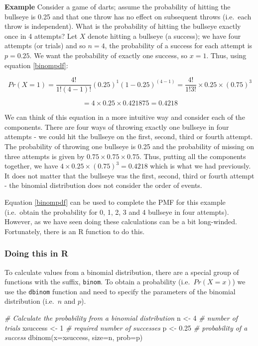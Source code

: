\documentclass[
  oneside]{krantz}
\newenvironment{Shaded}{\begin{snugshade}}{\end{snugshade}}
\newcommand{\AttributeTok}[1]{\textcolor[rgb]{0.77,0.63,0.00}{#1}}
\newcommand{\CommentTok}[1]{\textcolor[rgb]{0.56,0.35,0.01}{\textit{#1}}}
\newcommand{\DecValTok}[1]{\textcolor[rgb]{0.00,0.00,0.81}{#1}}
\newcommand{\FloatTok}[1]{\textcolor[rgb]{0.00,0.00,0.81}{#1}}
\newcommand{\FunctionTok}[1]{\textcolor[rgb]{0.00,0.00,0.00}{#1}}
\newcommand{\NormalTok}[1]{#1}
\newcommand{\OtherTok}[1]{\textcolor[rgb]{0.56,0.35,0.01}{#1}}
\begin{document}
\textbf{Example} Consider a game of darts; assume the probability of hitting the bullseye is 0.25 and that one throw has no effect on subsequent throws (i.e.~each throw is independent). What is the probability of hitting the bullseye exactly once in 4 attempts? Let \(X\) denote hitting a bullseye (a success); we have four attempts (or trials) and so \(n=4\), the probability of a success for each attempt is \(p=0.25\). We want the probability of exactly one success, so \(x=1\). Thus, using equation \ref{binompdf}:

\[Pr(X=1) = \frac{4!}{1!(4-1)!}(0.25)^1 (1-0.25)^{(4-1)} = \frac{4!}{1!3!} \times 0.25 \times (0.75)^3\]

\[ = 4 \times 0.25 \times 0.421875 = 0.4218\]

We can think of this equation in a more intuitive way and consider each of the components. There are four ways of throwing exactly one bullseye in four attempts - we could hit the bullseye on the first, second, third or fourth attempt. The probability of throwing one bullseye is 0.25 and the probability of missing on three attempts is given by \(0.75 \times 0.75 \times 0.75\). Thus, putting all the components together, we have \(4 \times 0.25 \times (0.75)^3 = 0.4218\) which is what we had previously. It does not matter that the bullseye was the first, second, third or fourth attempt - the binomial distribution does not consider the order of events.

Equation \ref{binompdf} can be used to complete the PMF for this example (i.e.~obtain the probability for 0, 1, 2, 3 and 4 bullseye in four attempts). However, as we have seen doing these calculations can be a bit long-winded. Fortunately, there is an R function to do this.

\hypertarget{binomR}{%
\subsubsection{Doing this in R}\label{binomR}}

To calculate values from a binomial distribution, there are a special group of functions with the suffix, \texttt{binom}. To obtain a probability (i.e.~\(Pr(X=x)\)) we use the \texttt{dbinom} function and need to specify the parameters of the binomial distribution (i.e.~\(n\) and \(p\)).

\begin{Shaded}
\begin{Highlighting}[]
\CommentTok{\# Calculate the probability from a binomial distribution}
\NormalTok{n }\OtherTok{\textless{}{-}} \DecValTok{4} \CommentTok{\# number of trials}
\NormalTok{xsuccess }\OtherTok{\textless{}{-}} \DecValTok{1} \CommentTok{\# required number of successes}
\NormalTok{p }\OtherTok{\textless{}{-}} \FloatTok{0.25} \CommentTok{\# probability of a success}
\FunctionTok{dbinom}\NormalTok{(}\AttributeTok{x=}\NormalTok{xsuccess, }\AttributeTok{size=}\NormalTok{n, }\AttributeTok{prob=}\NormalTok{p)}
\end{Highlighting}
\end{Shaded}
\end{document}
